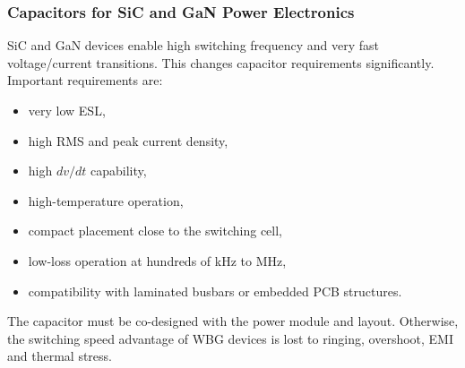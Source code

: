 \begin{frame}
\frametitle{Capacitors for SiC and GaN Power Electronics}
SiC and GaN devices enable high switching frequency and very fast voltage/current transitions. This changes capacitor requirements significantly. Important requirements are:

\begin{itemize}
    \item very low ESL,
    \item high RMS and peak current density,
    \item high \(dv/dt\) capability,
    \item high-temperature operation,
    \item compact placement close to the switching cell,
    \item low-loss operation at hundreds of kHz to MHz,
    \item compatibility with laminated busbars or embedded PCB structures.
\end{itemize}

The capacitor must be co-designed with the power module and layout. Otherwise, the switching speed advantage of WBG devices is lost to ringing, overshoot, EMI and thermal stress.

\end{frame}


